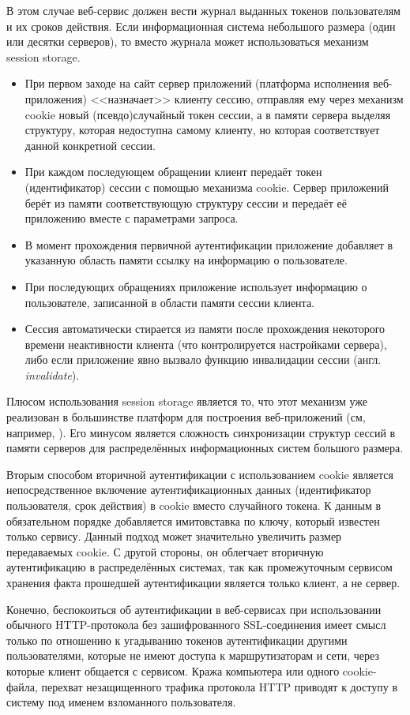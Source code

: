 В этом случае веб-сервис должен вести журнал выданных токенов пользователям и их сроков действия. Если информационная система небольшого размера (один или десятки серверов), то вместо журнала может использоваться механизм session storage.
\begin{itemize}
	\item При первом заходе на сайт сервер приложений (платформа исполнения веб-приложения) <<назначает>> клиенту сессию, отправляя ему через механизм cookie новый (псевдо)случайный токен сессии, а в памяти сервера выделяя структуру, которая недоступна самому клиенту, но которая соответствует данной конкретной сессии.
	\item При каждом последующем обращении клиент передаёт токен (идентификатор) сессии с помощью механизма cookie. Сервер приложений берёт из памяти соответствующую структуру сессии и передаёт её приложению вместе с параметрами запроса.
	\item В момент прохождения первичной аутентификации приложение добавляет в указанную область памяти ссылку на информацию о пользователе.
	\item При последующих обращениях приложение использует информацию о пользователе, записанной в области памяти сессии клиента.
	\item Сессия автоматически стирается из памяти после прохождения некоторого времени неактивности клиента (что контролируется настройками сервера), либо если приложение явно вызвало функцию инвалидации сессии (англ. \textit{invalidate}).
\end{itemize}

Плюсом использования session storage является то, что этот механизм уже реализован в большинстве платформ для построения веб-приложений (см, например, \cite[Controlling sessions]{Brittain:Darwin:2007}). Его минусом является сложность синхронизации структур сессий в памяти серверов для распределённых информационных систем большого размера.

Вторым способом вторичной аутентификации с использованием cookie является непосредственное включение аутентификационных данных (идентификатор пользователя, срок действия) в cookie вместо случайного токена. К данным в обязательном порядке добавляется имитовставка по ключу, который известен только сервису. Данный подход может значительно увеличить размер передаваемых cookie. С другой стороны, он облегчает вторичную аутентификацию в распределённых системах, так как промежуточным сервисом хранения факта прошедшей аутентификации является только клиент, а не сервер.

Конечно, беспокоиться об аутентификации в веб-сервисах при использовании обычного HTTP-протокола без зашифрованного SSL-соединения имеет смысл только по отношению к угадыванию токенов аутентификации другими пользователями, которые не имеют доступа к маршрутизаторам и сети, через которые клиент общается с сервисом. Кража компьютера или одного cookie-файла, перехват незащищенного трафика протокола HTTP приводят к доступу в систему под именем взломанного пользователя.
